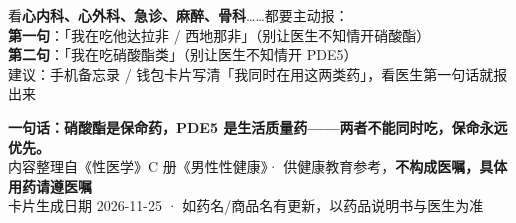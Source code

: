 \documentclass[a4paper,8.5pt]{ctexart}
\newcommand{\cardtitle}[1]{{\color{white}\bfseries\small #1}}
\begin{document}
\begin{card}[colback=myblueL, colframe=myblue, title={\cardtitle{6\ \ 看任何医生，先说这一句}}]
{\small
看\textbf{心内科、心外科、急诊、麻醉、骨科}……都要主动报：\\[1pt]
\textbf{第一句}：「我在吃\textcolor{myblue}{他达拉非 / 西地那非}」（别让医生不知情开硝酸酯）\\
\textbf{第二句}：「我在吃\textcolor{myred}{硝酸酯类}」（别让医生不知情开 PDE5）\\[1pt]
{\color{mygray}\small 建议：手机备忘录 / 钱包卡片写清「我同时在用这两类药」，看医生第一句话就报出来}
}
\end{card}

\vspace{0.8mm}
\begin{center}
{\color{myred}\bfseries 一句话：硝酸酯是保命药，PDE5 是生活质量药——两者不能同时吃，保命永远优先。}\\[1pt]
{\color{mygray}\scriptsize 内容整理自《性医学》C 册《男性性健康》· 供健康教育参考，\textbf{不构成医嘱，具体用药请遵医嘱}\\
卡片生成日期 2026-11-25 · 如药名/商品名有更新，以药品说明书与医生为准}
\end{center}
\end{document}

